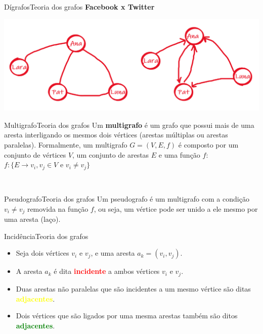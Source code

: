 \documentclass[t]{beamer}
\begin{document}
\begin{ftst}{Dígrafos}{Teoria dos grafos}
\centering
\textbf{Facebook x Twitter}

\vone

\vone
\centering
\includegraphics[scale=0.5]{Figuras/facetwitter.png}\\

\end{ftst}



\begin{ftst}{Multigrafo}{Teoria dos grafos}
\justifying
Um \textbf{multigrafo} é um grafo que possui mais de uma aresta interligando os mesmos dois vértices (arestas múltiplas ou arestas paralelas). 
\vone
Formalmente, um multigrafo $G = (V,E,f)$ é composto por um conjunto de vértices $V$, um conjunto de arestas $E$ e uma função $f$:
\vone
\centering
\huge
$f: \{E \rightarrow v_i, v_j \in V$ e $v_i \neq v_j \}$


\\


\end{ftst}


\begin{ftst}{Pseudografo}{Teoria dos grafos}
\justifying
Um pseudografo é um multigrafo com a condição $v_i \neq v_j$ removida na função $f$, ou seja, um vértice pode ser unido a ele mesmo por uma aresta (laço).
\vone
\vone
\centering
\\


\end{ftst}


\begin{ftst}{Incidência}{Teoria dos grafos}
\justifying
\begin{itemize}
    \item Seja dois vértices $v_i$ e $v_j$, e uma aresta $a_k = (v_i,v_j)$.
    \item A aresta $a_k$ é dita \textcolor{red}{\textbf{incidente}} a ambos vértices $v_i$ e $v_j$.
    \item Duas arestas não paralelas que são incidentes a um mesmo vértice são ditas \textcolor{yellow}{\textbf{adjacentes}}.
    \item Dois vértices que são ligados por uma mesma arestas também são ditos \textcolor{green}{\textbf{adjacentes}}. 
\end{itemize}
\vone
\vone
\centering
\\


\end{ftst}
\end{document}
